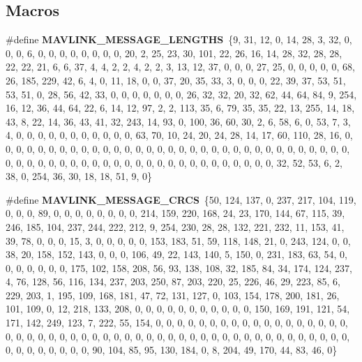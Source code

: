 \subsection*{Macros}
\begin{DoxyCompactItemize}
\item 
\#define \textbf{ M\+A\+V\+L\+I\+N\+K\+\_\+\+M\+E\+S\+S\+A\+G\+E\+\_\+\+L\+E\+N\+G\+T\+HS}~\{9, 31, 12, 0, 14, 28, 3, 32, 0, 0, 0, 6, 0, 0, 0, 0, 0, 0, 0, 0, 20, 2, 25, 23, 30, 101, 22, 26, 16, 14, 28, 32, 28, 28, 22, 22, 21, 6, 6, 37, 4, 4, 2, 2, 4, 2, 2, 3, 13, 12, 37, 0, 0, 0, 27, 25, 0, 0, 0, 0, 0, 68, 26, 185, 229, 42, 6, 4, 0, 11, 18, 0, 0, 37, 20, 35, 33, 3, 0, 0, 0, 22, 39, 37, 53, 51, 53, 51, 0, 28, 56, 42, 33, 0, 0, 0, 0, 0, 0, 0, 26, 32, 32, 20, 32, 62, 44, 64, 84, 9, 254, 16, 12, 36, 44, 64, 22, 6, 14, 12, 97, 2, 2, 113, 35, 6, 79, 35, 35, 22, 13, 255, 14, 18, 43, 8, 22, 14, 36, 43, 41, 32, 243, 14, 93, 0, 100, 36, 60, 30, 2, 6, 58, 6, 0, 53, 7, 3, 4, 0, 0, 0, 0, 0, 0, 0, 0, 0, 0, 0, 63, 70, 10, 24, 20, 24, 28, 14, 17, 60, 110, 28, 16, 0, 0, 0, 0, 0, 0, 0, 0, 0, 0, 0, 0, 0, 0, 0, 0, 0, 0, 0, 0, 0, 0, 0, 0, 0, 0, 0, 0, 0, 0, 0, 0, 0, 0, 0, 0, 0, 0, 0, 0, 0, 0, 0, 0, 0, 0, 0, 0, 0, 0, 0, 0, 0, 0, 0, 0, 0, 0, 32, 52, 53, 6, 2, 38, 0, 254, 36, 30, 18, 18, 51, 9, 0\}
\item 
\#define \textbf{ M\+A\+V\+L\+I\+N\+K\+\_\+\+M\+E\+S\+S\+A\+G\+E\+\_\+\+C\+R\+CS}~\{50, 124, 137, 0, 237, 217, 104, 119, 0, 0, 0, 89, 0, 0, 0, 0, 0, 0, 0, 0, 214, 159, 220, 168, 24, 23, 170, 144, 67, 115, 39, 246, 185, 104, 237, 244, 222, 212, 9, 254, 230, 28, 28, 132, 221, 232, 11, 153, 41, 39, 78, 0, 0, 0, 15, 3, 0, 0, 0, 0, 0, 153, 183, 51, 59, 118, 148, 21, 0, 243, 124, 0, 0, 38, 20, 158, 152, 143, 0, 0, 0, 106, 49, 22, 143, 140, 5, 150, 0, 231, 183, 63, 54, 0, 0, 0, 0, 0, 0, 0, 175, 102, 158, 208, 56, 93, 138, 108, 32, 185, 84, 34, 174, 124, 237, 4, 76, 128, 56, 116, 134, 237, 203, 250, 87, 203, 220, 25, 226, 46, 29, 223, 85, 6, 229, 203, 1, 195, 109, 168, 181, 47, 72, 131, 127, 0, 103, 154, 178, 200, 181, 26, 101, 109, 0, 12, 218, 133, 208, 0, 0, 0, 0, 0, 0, 0, 0, 0, 0, 0, 150, 169, 191, 121, 54, 171, 142, 249, 123, 7, 222, 55, 154, 0, 0, 0, 0, 0, 0, 0, 0, 0, 0, 0, 0, 0, 0, 0, 0, 0, 0, 0, 0, 0, 0, 0, 0, 0, 0, 0, 0, 0, 0, 0, 0, 0, 0, 0, 0, 0, 0, 0, 0, 0, 0, 0, 0, 0, 0, 0, 0, 0, 0, 0, 0, 0, 0, 0, 0, 0, 0, 90, 104, 85, 95, 130, 184, 0, 8, 204, 49, 170, 44, 83, 46, 0\}
\item 

\end{DoxyCompactItemize}
